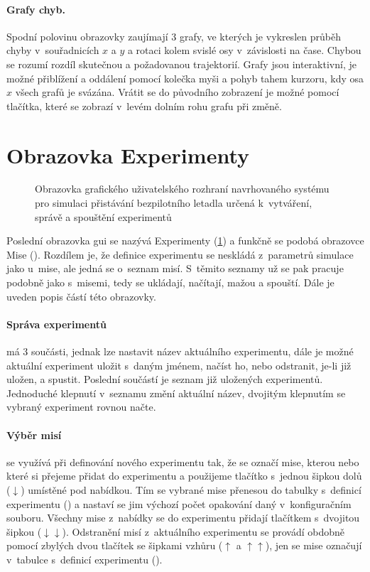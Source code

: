         \paragraph{ Grafy chyb.} Spodní polovinu obrazovky zaujímají 3 grafy, ve kterých je vykreslen průběh chyby v~souřadnicích $x$ a $y$ a rotaci kolem svislé osy v~závislosti na čase. Chybou se rozumí rozdíl skutečnou a požadovanou trajektorií. Grafy jsou interaktivní, je možné přiblížení a oddálení pomocí kolečka myši a pohyb tahem kurzoru, kdy osa $x$ všech grafů je svázána. Vrátit se do původního zobrazení je možné pomocí tlačítka, které se zobrazí v~levém dolním rohu grafu při změně.
    \section{Obrazovka Experimenty} \label{sec:experimenty}
        \begin{figure}
            \centering
            
            \caption[GUI: Obrazovka ]{Obrazovka  grafického uživatelského rozhraní navrhovaného systému pro simulaci přistávání bezpilotního letadla určená k~vytváření, správě a spouštění experimentů}
            \label{fig:tabExperimenty}
        \end{figure}
        Poslední obrazovka \acrshort{gui} se nazývá Experimenty (\cref{fig:tabExperimenty}) a funkčně se podobá obrazovce Mise (). Rozdílem je, že definice experimentu se neskládá z~parametrů simulace jako u~mise, ale jedná se o~seznam misí. S~těmito seznamy už se pak pracuje podobně jako s~misemi, tedy se ukládají, načítají, mažou a spouští. Dále je uveden popis částí této obrazovky.
        \paragraph{ Správa experimentů} má 3 součásti, jednak lze nastavit název aktuálního experimentu, dále je možné aktuální experiment uložit s~daným jménem, načíst ho, nebo odstranit, je-li již uložen, a spustit. Poslední součástí je seznam již uložených experimentů. Jednoduché klepnutí v~seznamu změní aktuální název, dvojitým klepnutím se vybraný experiment rovnou načte.

        \paragraph{ Výběr misí} se využívá při definování nového experimentu tak, že se označí mise, kterou nebo které si přejeme přidat do experimentu a použijeme tlačítko s~jednou šipkou dolů ($\downarrow$) umístěné pod nabídkou. Tím se vybrané mise přenesou do tabulky s~definicí experimentu () a nastaví se jim výchozí počet opakování daný v~konfiguračním souboru. Všechny mise z~nabídky se do experimentu přidají tlačítkem s~dvojitou šipkou ($\downarrow\downarrow$). Odstranění misí z~aktuálního experimentu se provádí obdobně pomocí zbylých dvou tlačítek se šipkami vzhůru ($\uparrow$ a $\uparrow\uparrow$), jen se mise označují v~tabulce s~definicí experimentu ().

